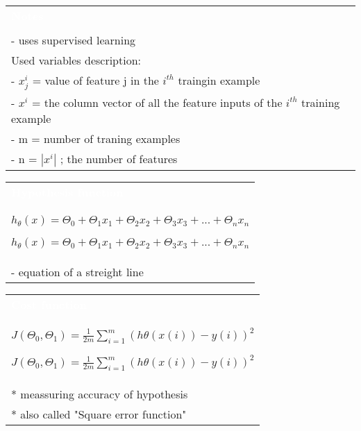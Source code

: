 \documentclass[a4paper,12pt,ngerman,fleqn]{article}
\newcommand{\mybox}[3]{
        \centering
        \begin{tabularx}{0.9\textwidth}{|X|}
            \rowcolor{accent}
            \textcolor{white}{\textbf{#1}} \\
            \def\temp{#2}\ifx\temp\empty
                
            \else
                #2 \\ \hline
            \fi
            #3
            \\ \hline
        \end{tabularx}
    }
\begin{document}
    
    \setlength{\parindent}{0cm}


    \begin{minipage}[t]{.51\textwidth}
        \vspace{1pt}
        \mybox
            {Notes}
            {}
            {
                - uses supervised learning \\ \hline
                Used variables description: \\
                - \(x_{j}^i\) = value of feature j in the \(i^{th}\) traingin example \\
                - \(x^i\) = the column vector of all the feature inputs of the \(i^{th}\) training example \\
                - m = number of traning examples \\
                - n = \(|x^i|\) ; the number of features
            }
        \newline
        \newline
        \newline
        \mybox
            {Hypothesis function}
            {\( h_{\theta}(x) = \Theta_{0} + \Theta_{1}x_{1} + \Theta_{2}x_{2} + \Theta_{3}x_{3} + ... + \Theta_{n}x_{n} \)}
            {
                - equation of a streight line
            }
        \newline
        \newline
        \newline
        \mybox
            {Cost function}
            {\( J(\Theta_{0}, \Theta_{1}) = \frac{1}{2m} \sum\limits_{i=1}^{m} (h\theta(x{(i)}) - y{(i)})^2 \)}
            {
                * meassuring accuracy of hypothesis \\
                * also called "Square error function"
            }
        \newline
    \end{minipage}%
    \begin{minipage}[t]{.51\textwidth}
        \vspace{1pt}
        
    \end{minipage}
    
\end{document}
